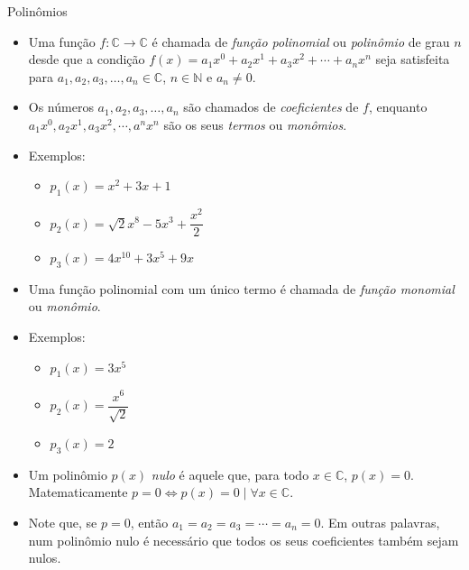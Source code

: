 \documentclass[14pt, aspectratio=169]{beamer}
\newcommand{\C}{\mathbb{C}}
\newcommand{\N}{\mathbb{N}}
\newcommand{\skipframe}{\vspace{10.0cm}}
\begin{document}
\begin{frame}[allowframebreaks]{Polinômios}

\begin{itemize}
    \item Uma função $f: \C \rightarrow \C$ é chamada de \emph{função polinomial} ou \emph{polinômio} de grau $n$ desde que a condição $f(x) = a_1 x^0 + a_2 x^1 + a_3 x^2 + \cdots + a_n x^n$ seja satisfeita para $a_1, a_2, a_3, \ldots, a_n \in \C$, $n \in \N$ e $a_n \neq 0$.

    \item Os números $a_1, a_2, a_3, \ldots, a_n$ são chamados de \emph{coeficientes} de $f$, enquanto $a_1 x^0, a_2 x^1, a_3 x^2, \cdots, a^n x^n$ são os seus \emph{termos} ou \emph{monômios}.

    \skipframe

    \item Exemplos:
    \begin{itemize}
        \item $p_1(x) = x^2 + 3x + 1$
        \item $p_2(x) = \sqrt{2}x^8 - 5x^3 + \dfrac{x^2}{2}$
        \item $p_3(x) = 4x^{10} + 3x^5 + 9x$
    \end{itemize}

    \skipframe

    \item Uma função polinomial com um único termo é chamada de \emph{função monomial} ou \emph{monômio}.

    \item Exemplos:
    \begin{itemize}
        \item $p_1(x) = 3x^5$
        \item $p_2(x) = \dfrac{x^6}{\sqrt{2}}$
        \item $p_3(x) = 2$
    \end{itemize}

    \skipframe

    \item Um polinômio $p(x)$ \emph{nulo} é aquele que, para todo $x \in \C$, $p(x) = 0$. Matematicamente $p = 0 \Leftrightarrow p(x) = 0 \mid \forall x \in \C$.

    \item Note que, se $p = 0$, então $a_1 = a_2 = a_3 = \cdots = a_n = 0$. Em outras palavras, num polinômio nulo é necessário que todos os seus coeficientes também sejam nulos.

    \skipframe


\end{itemize}
\end{frame}
\end{document}
